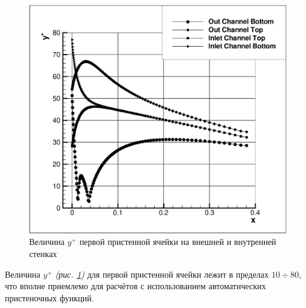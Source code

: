 \begin{figure}[h]
	\centering
	\includegraphics[scale=0.4]{uDuctyplus}
	\caption{Величина $y^{+}$ первой пристенной ячейки на внешней и внутренней стенках}
	\label{fig:uDuctyplus}
\end{figure}
\clearpage

Величина $y^{+}$ \textit{(рис. \ref{fig:uDuctyplus})} для первой пристенной ячейки лежит в пределах $10 \div 80$, что вполне приемлемо для расчётов с использованием автоматических пристеночных функций.

